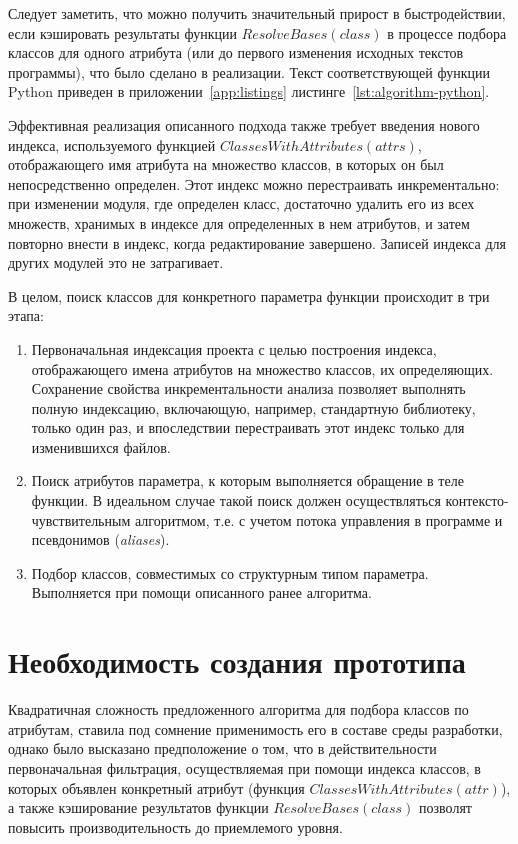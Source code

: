 Следует заметить, что можно получить значительный прирост в быстродействии, если
кэшировать результаты функции $ResolveBases(class)$ в процессе подбора классов
для одного атрибута (или до первого изменения исходных текстов программы), что
было сделано в реализации. Текст соответствующей функции Python приведен в
приложении~\ref{app:listings} листинге~\ref{lst:algorithm-python}.

Эффективная реализация описанного подхода также требует введения нового
индекса, используемого функцией $ClassesWithAttributes(attrs)$, отображающего
имя атрибута на множество классов, в которых он был непосредственно определен.
Этот индекс можно перестраивать инкрементально: при изменении модуля, где
определен класс, достаточно удалить его из всех множеств, хранимых в индексе для
определенных в нем атрибутов, и затем повторно внести в индекс, когда
редактирование завершено. Записей индекса для других модулей это не затрагивает.

В целом, поиск классов для конкретного параметра функции происходит в три этапа:

\begin{enumerate}
  \item Первоначальная индексация проекта с целью построения
    индекса, отображающего имена атрибутов на множество классов, их определяющих.
    Сохранение свойства инкрементальности анализа позволяет выполнять полную
    индексацию, включающую, например, стандартную библиотеку, только один раз,
    и впоследствии перестраивать этот индекс только для изменившихся файлов.

  \item Поиск атрибутов параметра, к которым выполняется обращение в теле
    функции. В идеальном случае такой поиск должен осуществляться
    контексто-чувствительным алгоритмом, т.е. с учетом потока управления в
    программе и псевдонимов (\emph{aliases}).

  \item Подбор классов, совместимых со структурным типом параметра.
    Выполняется при помощи описанного ранее алгоритма.

\end{enumerate}


\section{Необходимость создания прототипа}
\label{sec:prototype-necessity}

Квадратичная сложность предложенного алгоритма для подбора классов по атрибутам,
ставила под сомнение применимость его в составе среды разработки, однако было
высказано предположение о том, что в действительности первоначальная фильтрация,
осуществляемая при помощи индекса классов, в которых объявлен конкретный
атрибут (функция $ClassesWithAttributes(attr)$), а также кэширование результатов
функции $ResolveBases(class)$ позволят повысить производительность до
приемлемого уровня.

